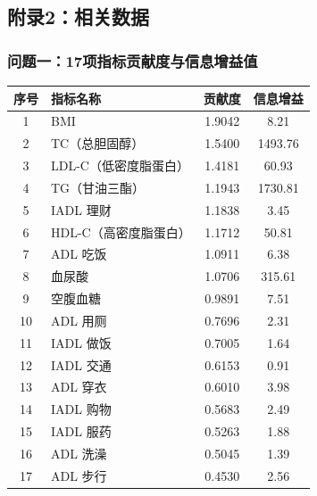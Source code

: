 \documentclass[12pt]{article}
\begin{document}
\newpage

\subsection{附录2：相关数据}
\subsubsection{问题一：17项指标贡献度与信息增益值} 
\begin{center}
	\label{tab:17features_importance}
	\begin{tabular}{c l c c}
		\toprule
		序号 & 指标名称 & 贡献度 & 信息增益 \\
		\midrule
		1  & BMI                  & 1.9042 & 8.21    \\
		2  & TC（总胆固醇）       & 1.5400 & 1493.76 \\
		3  & LDL-C（低密度脂蛋白）& 1.4181 & 60.93   \\
		4  & TG（甘油三酯）       & 1.1943 & 1730.81 \\
		5  & IADL 理财            & 1.1838 & 3.45    \\
		6  & HDL-C（高密度脂蛋白）& 1.1712 & 50.81   \\
		7  & ADL 吃饭             & 1.0911 & 6.38    \\
		8  & 血尿酸               & 1.0706 & 315.61  \\
		9  & 空腹血糖             & 0.9891 & 7.51    \\
		10 & ADL 用厕             & 0.7696 & 2.31    \\
		11 & IADL 做饭            & 0.7005 & 1.64    \\
		12 & IADL 交通            & 0.6153 & 0.91    \\
		13 & ADL 穿衣             & 0.6010 & 3.98    \\
		14 & IADL 购物            & 0.5683 & 2.49    \\
		15 & IADL 服药            & 0.5263 & 1.88    \\
		16 & ADL 洗澡             & 0.5045 & 1.39    \\
		17 & ADL 步行             & 0.4530 & 2.56    \\
		\bottomrule
	\end{tabular}
\end{center}
\end{document}
